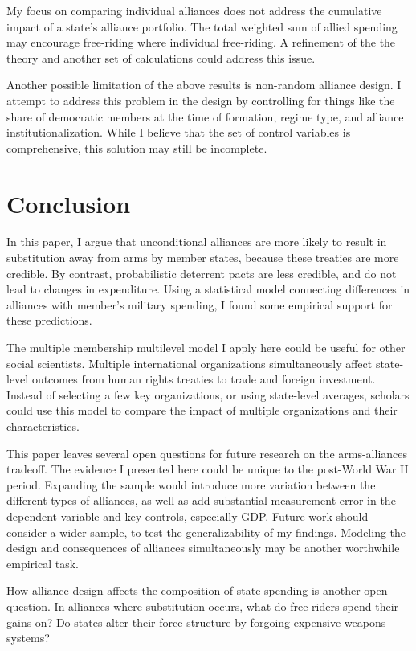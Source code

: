 \documentclass[12pt]{article}
\begin{document}
My focus on comparing individual alliances does not address the cumulative impact of a state's alliance portfolio. The total weighted sum of allied spending may encourage free-riding where individual free-riding. A refinement of the the theory and another set of calculations could address this issue.  

Another possible limitation of the above results is non-random alliance design. I attempt to address this problem in the design by controlling for things like the share of democratic members at the time of formation, regime type, and alliance institutionalization. While I believe that the set of control variables is comprehensive, this solution may still be incomplete. 



\section*{Conclusion}

In this paper, I argue that unconditional alliances are more likely to result in substitution away from arms by member states, because these treaties are more credible. By contrast, probabilistic deterrent pacts are less credible, and do not lead to changes in expenditure. Using a statistical model connecting differences in alliances with member's military spending, I found some empirical support for these predictions.

The multiple membership multilevel model I apply here could be useful for other social scientists. Multiple international organizations simultaneously affect state-level outcomes from human rights treaties to trade and foreign investment. Instead of selecting a few key organizations, or using state-level averages, scholars could use this model to compare the impact of multiple organizations and their characteristics. 

This paper leaves several open questions for future research on the arms-alliances tradeoff. The evidence I presented here could be unique to the post-World War II period. Expanding the sample would introduce more variation between the different types of alliances, as well as add substantial measurement error in the dependent variable and key controls, especially GDP. Future work should consider a wider sample, to test the generalizability of my findings. Modeling the design and consequences of alliances simultaneously may be another worthwhile empirical task. 

How alliance design affects the composition of state spending is another open question. In alliances where substitution occurs, what do free-riders spend their gains on? Do states alter their force structure by forgoing expensive weapons systems? 
\end{document}
